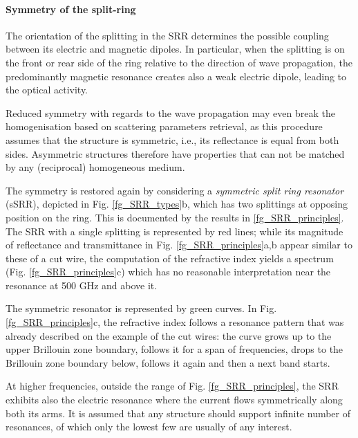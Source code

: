 \paragraph{Symmetry of the split-ring}%
The orientation of the splitting in the SRR determines the possible coupling between its electric and magnetic dipoles. In particular, when the splitting is on the front or rear side of the ring relative to the  direction of wave propagation, the predominantly magnetic resonance creates also a weak electric dipole, leading to the optical activity.

Reduced symmetry with regards to the wave propagation may even break the homogenisation based on scattering parameters retrieval, as this procedure assumes that the structure is symmetric, i.e., its reflectance is equal from both sides. Asymmetric structures therefore have properties that can not be matched by any (reciprocal) homogeneous medium. 

The symmetry is restored again by considering a \textit{symmetric split ring resonator} (sSRR), depicted in Fig. \ref{fg_SRR_types}b, which has two splittings at opposing position on the ring. 
This is documented by the results in \ref{fg_SRR_principles}. The SRR with a single splitting is represented by red lines; while its magnitude of reflectance and transmittance in Fig. \ref{fg_SRR_principles}a,b appear similar to these of a cut wire, the computation of the refractive index yields a spectrum (Fig. \ref{fg_SRR_principles}c) which has no reasonable interpretation near the resonance at 500 GHz and above it. 

The symmetric resonator is represented by green curves. In Fig. \ref{fg_SRR_principles}c, the refractive index follows a resonance pattern that was already described on the example of the cut wires: the curve grows up to the upper Brillouin zone boundary, follows it for a span of frequencies, drops to the Brillouin zone boundary below, follows it again and then a next band starts. 

At higher frequencies, outside the range of Fig. \ref{fg_SRR_principles}, the SRR exhibits also the electric resonance where the current flows symmetrically along both its arms. It is assumed that any structure should support infinite number of resonances, of which only the lowest few are usually of any interest.
